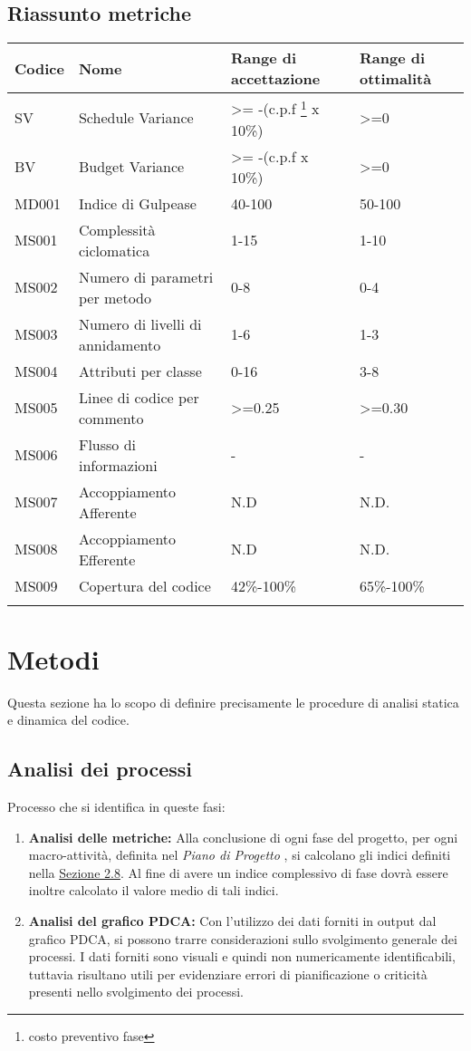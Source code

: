 \subsection{Riassunto metriche}
\begin{center}
\begin{tabularx}{\textwidth}{|X|X|X|X|}

	\hline
	\textbf{Codice} & \textbf{Nome} & 	\textbf{Range di accettazione} & \textbf{Range di ottimalità}\\
	\endhead
	\hline
			SV & Schedule Variance& >= -(c.p.f \footnote{costo preventivo fase} x 10\%)& >=0  \\
	\hline
	BV & Budget Variance & >= -(c.p.f x 10\%)& >=0 \\
	\hline
	MD001 & Indice di Gulpease & 40-100 & 50-100\\
	\hline
	MS001 & Complessità ciclomatica & 1-15 & 1-10 \\
	\hline
	MS002 & Numero di parametri per metodo & 0-8 & 0-4 \\
	\hline
	MS003 & Numero di livelli di annidamento & 1-6 & 1-3 \\
	\hline
	MS004 & Attributi per classe & 0-16 & 3-8 \\
	\hline
	MS005 & Linee di codice per commento & >=0.25 & >=0.30 \\
	\hline
	MS006 & Flusso di informazioni & - & - \\
	\hline
	MS007 & Accoppiamento Afferente & N.D & N.D. \\
	\hline
	MS008 & Accoppiamento Efferente& N.D & N.D. \\
	\hline
	MS009 & Copertura del codice & 42\%-100\% & 65\%-100\% \\
	\hline
	\caption{Tabella delle metriche}
\end{tabularx}
\end{center}

\section{Metodi}\label{Metodi}
Questa sezione ha lo scopo di definire precisamente le procedure di analisi statica e dinamica del codice.
\subsection{Analisi dei processi}
Processo che si identifica in queste fasi:
\begin{enumerate}
	\item \textbf{Analisi delle metriche:} Alla conclusione di ogni fase del progetto, per ogni macro-attività, definita nel
	\textit{Piano di Progetto} , si calcolano gli indici definiti nella \hyperref[Metriche]{Sezione 2.8}. Al fine
	di avere un indice complessivo di fase dovrà essere inoltre calcolato il valore medio
	di tali indici.
	\item \textbf{Analisi del grafico PDCA:} Con l'utilizzo dei dati forniti in output dal grafico PDCA, si possono trarre considerazioni sullo svolgimento generale dei processi.
	I dati forniti sono visuali e quindi non numericamente identificabili, tuttavia risultano utili per evidenziare errori di pianificazione o criticità presenti nello svolgimento dei processi.
\end{enumerate}

